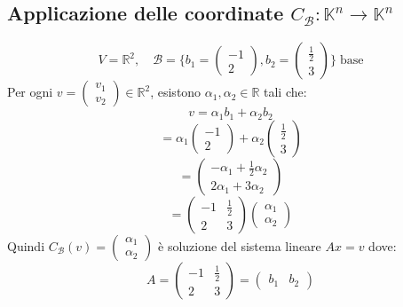 \documentclass[a4paper]{article}
\theoremstyle{break}
\theoremstyle{break}
\theoremstyle{break}
\theoremstyle{break}
\begin{document}
\subsection{Applicazione delle coordinate \texorpdfstring{\( C_{\mathcal{B}}: \mathbb{K}^n \to \mathbb{K}^n \)}{C\_B: K\^n -> K\^n}}
\label{7.5}
\begin{example}
  \[
  V = \mathbb{R}^2, \quad \mathcal{B} = \{b_1 = \begin{pmatrix}
      -1\\2
  \end{pmatrix},
  b_2 = \begin{pmatrix} 
    \frac{1}{2}\\
    3
  \end{pmatrix} 
\} \; \text{base}
  \] 
  Per ogni \( v = \begin{pmatrix} v_1\\v_2 \end{pmatrix} \in \mathbb{R}^2 \), esistono
  \( \alpha_1, \alpha_2 \in \mathbb{R} \) tali che:
  \[
  v = \alpha_1 b_1 + \alpha_2 b_2
  \] 
  \[
  = \alpha_1 \begin{pmatrix} 
    -1\\
    2
  \end{pmatrix} 
  +
  \alpha_2 \begin{pmatrix} 
    \frac{1}{2}\\
    3
  \end{pmatrix} 
  \] 
  \[
  = \begin{pmatrix} 
    -\alpha_1 + \frac{1}{2}\alpha_2\\
    2 \alpha_1 + 3 \alpha_2
  \end{pmatrix} 
  \] 
  \[
  = \begin{pmatrix} 
    -1 & \frac{1}{2}\\
    2 & 3
  \end{pmatrix} 
  \begin{pmatrix} 
    \alpha_1\\
    \alpha_2
  \end{pmatrix} 
  \] 
  Quindi \( C_{\mathcal{B}}(v) = \begin{pmatrix} \alpha_1\\\alpha_2 \end{pmatrix}  \) 
  è soluzione del sistema lineare \( Ax = v \) dove:
  \[
  A = \begin{pmatrix} 
    -1 & \frac{1}{2}\\
    2 & 3
  \end{pmatrix} 
  =
  \begin{pmatrix} b_1 & b_2 \end{pmatrix} 
\]
\end{example}
\end{document}

